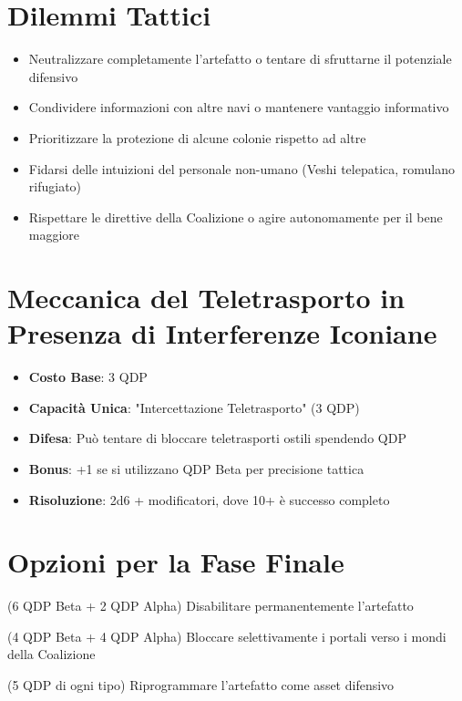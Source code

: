 \documentclass[11pt,a4paper]{article}
\begin{document}
\section{Dilemmi Tattici}

\begin{tcolorbox}[colback=militarylightgray!10, colframe=militaryred]
\begin{itemize}[leftmargin=*]
\item Neutralizzare completamente l'artefatto o tentare di sfruttarne il potenziale difensivo
\item Condividere informazioni con altre navi o mantenere vantaggio informativo
\item Prioritizzare la protezione di alcune colonie rispetto ad altre
\item Fidarsi delle intuizioni del personale non-umano (Veshi telepatica, romulano rifugiato)
\item Rispettare le direttive della Coalizione o agire autonomamente per il bene maggiore
\end{itemize}
\end{tcolorbox}

\section{Meccanica del Teletrasporto in Presenza di Interferenze Iconiane}

\begin{tcolorbox}[colback=militarylightgray!10, colframe=militaryred]
\begin{itemize}[leftmargin=*]
\item \textbf{Costo Base}: 3 QDP
\item \textbf{Capacità Unica}: "Intercettazione Teletrasporto" (3 QDP)
\item \textbf{Difesa}: Può tentare di bloccare teletrasporti ostili spendendo QDP
\item \textbf{Bonus}: +1 se si utilizzano QDP Beta per precisione tattica
\item \textbf{Risoluzione}: 2d6 + modificatori, dove 10+ è successo completo
\end{itemize}
\end{tcolorbox}

\section{Opzioni per la Fase Finale}

\begin{tcolorbox}[colback=militarylightgray!10, colframe=militaryred]
\begin{description}[leftmargin=*]
\item[Neutralizzazione Completa] (6 QDP Beta + 2 QDP Alpha) Disabilitare permanentemente l'artefatto
\item[Scudo Difensivo] (4 QDP Beta + 4 QDP Alpha) Bloccare selettivamente i portali verso i mondi della Coalizione
\item[Riconfigurazione Tattica] (5 QDP di ogni tipo) Riprogrammare l'artefatto come asset difensivo
\end{description}
\end{tcolorbox}
\end{document}
